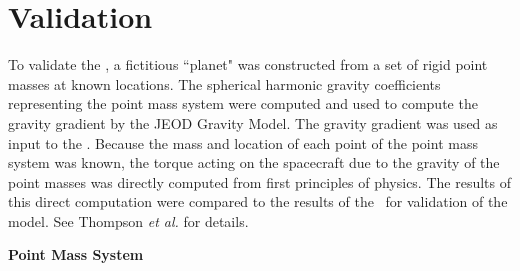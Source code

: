 \section{Validation}\label{sec:valid}

To validate the \gravitytorqueDesc, a fictitious ``planet" was constructed
from a set of rigid point masses at known locations. The spherical harmonic
gravity coefficients representing the point mass system were 
computed and used to compute the gravity gradient by the JEOD Gravity
Model.  The gravity gradient was used as input to the 
\gravitytorqueDesc. Because the mass and location of each point of
the point mass system was known, the torque acting on the spacecraft
due to the gravity of the point masses was directly computed from 
first principles of physics. The results of this direct computation
were compared to the results of the \gravitytorqueDesc\ for validation
of the model. See Thompson {\it et al.} for details\cite{thompson2008}.

{\bf Point Mass System}

